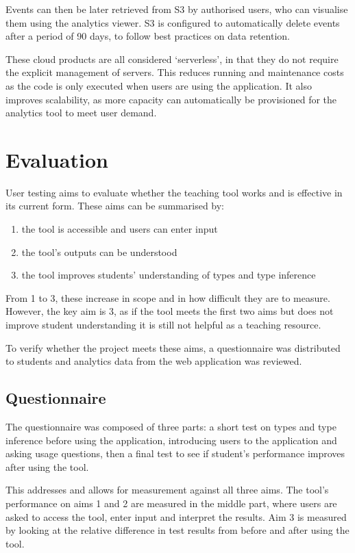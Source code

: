 \documentclass[a4paper,fleqn,oneside,12pt]{report}
\begin{document}
Events can then be later retrieved from S3 by authorised users, who can visualise them using the analytics viewer. S3 is configured to automatically delete events after a period of 90 days, to follow best practices on data retention.

These cloud products are all considered `serverless', in that they do not require the explicit management of servers. This reduces running and maintenance costs as the code is only executed when users are using the application. It also improves scalability, as more capacity can automatically be provisioned for the analytics tool to meet user demand.

\chapter{Evaluation}\label{id:h.e6letww4nhn0}

User testing aims to evaluate whether the teaching tool works and is effective in its current form. These aims can be summarised by:
\begin{enumerate}
  \item the tool is accessible and users can enter input
  \item the tool's outputs can be understood
  \item the tool improves students' understanding of types and type inference
\end{enumerate}

From 1 to 3, these increase in scope and in how difficult they are to measure. However, the key aim is 3, as if the tool meets the first two aims but does not improve student understanding it is still not helpful as a teaching resource.

To verify whether the project meets these aims, a questionnaire was distributed to students and analytics data from the web application was reviewed.

\section{Questionnaire}\label{id:h.yqiowsgjmohq}

The questionnaire was composed of three parts: a short test on types and type inference before using the application, introducing users to the application and asking usage questions, then a final test to see if student’s performance improves after using the tool.

This addresses and allows for measurement against all three aims. The tool’s performance on aims 1 and 2 are measured in the middle part, where users are asked to access the tool, enter input and interpret the results. Aim 3 is measured by looking at the relative difference in test results from before and after using the tool.
\end{document}
